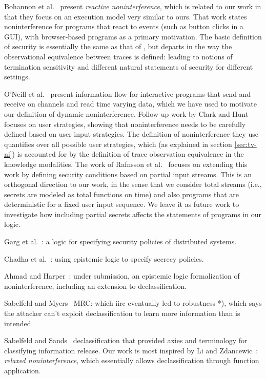 \documentclass[conference]{IEEEtran}
\theoremstyle{definition}
\begin{document}
Bohannon et al.~\cite{Bohannon:09} present \emph{reactive
  noninterference}, which is related to our work in that they focus on
an execution model very similar to ours.  That work states
noninterference for programs that react to events (such as button
clicks in a GUI), with browser-based programs as a primary motivation.
The basic definition of security is essentially the same as that of
\cite{Balliu:11}, but departs in the way the observational equivalence
between traces is defined: leading to notions of termination
sensitivity and different natural statements of security for different
settings.

O'Neill et al.~\cite{O'Neill:06} present information flow for
interactive programs that send and receive on channels and read time
varying data, which we have used to motivate our definition of dynamic
noninterference.  Follow-up work by Clark and Hunt~\cite{Clark:09}
focuses on user strategies, showing that noninterference needs to be
carefully defined based on user input strategies.  The definition of
noninterference they use quantifies over all possible user strategies,
which (as explained in section \ref{sec:tv-ni}) is accounted for by
the definition of trace observation equivalence in the knowledge
modalities.  The work of Rafnsson et al.~\cite{Rafnsson:12} focuses on
extending this work by defining security conditions based on partial
input streams.  This is an orthogonal direction to our work, in the
sense that we consider total streams (i.e., secrets are modeled as
total functions on time) and also programs that are deterministic for
a fixed user input sequence.  We leave it as future work to
investigate how including partial secrets affects the statements of
programs in our logic.

Garg et al.~\cite{Garg:06}: a logic for specifying security policies
of distributed systems.

Chadha et al.~\cite{Lee:09}: using epistemic logic to specify secrecy
policies.

Ahmad and Harper~\cite{Ahmad:13}: under submission, an epistemic logic
formalization of noninterference, including an extension to
declassification.

Sabelfeld and Myers~%
MRC: which iirc eventually led to robustness *), which says the
attacker can't exploit declassification to learn more information than
is intended.


Sabelfeld and Sands~%
declassification that provided axies and terminology for classifying
information release.  Our work is most inspired by Li and
Zdancewic~\cite{Li:05}: \emph{relaxed noninterference}, which
essentially allows declassification through function application.
\end{document}
